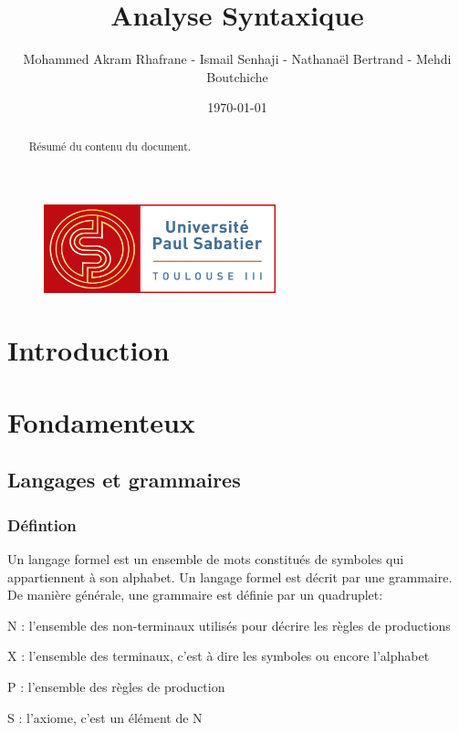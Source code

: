 \documentclass{article}
\title{Analyse Syntaxique}
\author{Mohammed Akram Rhafrane - Ismail Senhaji - Nathanaël Bertrand - Mehdi Boutchiche\\}
\date{\today}
\begin{document}
\begin{figure}[t]
	\centering
		\includegraphics[width=0.60\textwidth]{logo-ups.jpg}
	\label{fig:logo-ups}
\end{figure}

\maketitle

\newpage
\tableofcontents

\newpage
\begin{abstract}
Résumé du contenu du document.
\end{abstract}

\newpage
\section{Introduction}
\label{hints}

\newpage
\section{Fondamenteux}
\label{hints}
\subsection{Langages et grammaires}
\subsubsection{Défintion}
Un langage formel est un ensemble de mots constitués de symboles qui appartiennent à son alphabet.
Un langage formel est décrit par une grammaire.
De manière générale, une grammaire est définie par un quadruplet:

    N : l’ensemble des non-terminaux utilisés pour décrire les règles de productions

    X : l’ensemble des terminaux, c’est à dire les symboles ou encore l’alphabet

    P : l’ensemble des règles de production

    S : l’axiome, c’est un élément de N
\newline
\end{document}
